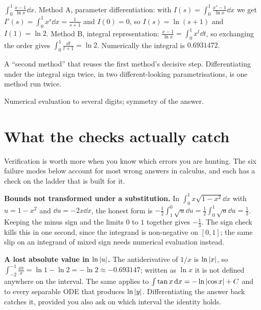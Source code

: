 \begin{worked}
$\displaystyle\int_{0}^{1}\frac{x-1}{\ln x}\dd x$. Method A, parameter differentiation: with $I(s)=\int_{0}^{1}\frac{x^{s}-1}{\ln x}\dd x$ we get $I'(s)=\int_{0}^{1}x^{s}\dd x=\frac{1}{s+1}$ and $I(0)=0$, so $I(s)=\ln(s+1)$ and $I(1)=\ln 2$. Method B, integral representation: $\frac{x-1}{\ln x}=\int_{0}^{1}x^{t}\dd t$, so exchanging the order gives $\int_{0}^{1}\frac{\dd t}{t+1}=\ln 2$. Numerically the integral is $0.6931472$.
\end{worked}

\begin{trap}
A ``second method'' that reuses the first method's decisive step. Differentiating under the integral sign twice, in two different-looking parametrisations, is one method run twice.
\end{trap}

\begin{seealsob}Numerical evaluation to several digits; symmetry of the answer.\end{seealsob}

\section{What the checks actually catch}

Verification is worth more when you know which errors you are hunting. The six failure modes below account for most wrong answers in calculus, and each has a check on the ladder that is built for it.

\textbf{Bounds not transformed under a substitution.} In $\int_{0}^{1}x\sqrt{1-x^{2}}\dd x$ with $u=1-x^{2}$ and $\dd u=-2x\dd x$, the honest form is $-\frac12\int_{1}^{0}\sqrt{u}\dd u=\frac12\int_{0}^{1}\sqrt{u}\dd u=\frac13$. Keeping the minus sign and the limits $0$ to $1$ together gives $-\frac13$. The sign check kills this in one second, since the integrand is non-negative on $[0,1]$; the same slip on an integrand of mixed sign needs numerical evaluation instead.

\textbf{A lost absolute value in $\ln\left\lvert u\right\rvert$.} The antiderivative of $1/x$ is $\ln\left\lvert x\right\rvert$, so $\int_{-2}^{-1}\frac{\dd x}{x}=\ln 1-\ln 2=-\ln 2\approx -0.693147$; written as $\ln x$ it is not defined anywhere on the interval. The same applies to $\int\tan x\,\mathrm{d} x=-\ln\left\lvert \cos x\right\rvert+C$ and to every separable ODE that produces $\ln\left\lvert y\right\rvert$. Differentiating the answer back catches it, provided you also ask on which interval the identity holds.

